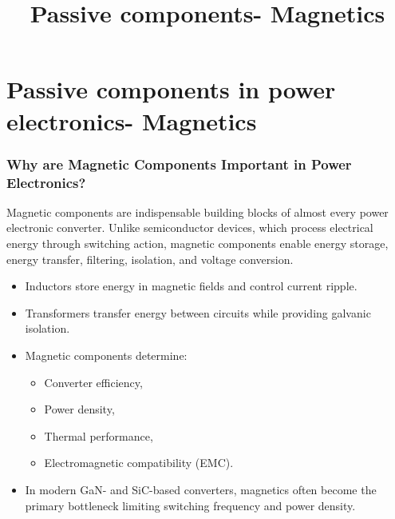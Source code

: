 \section{Passive components in power electronics- Magnetics}
\title[Passive components- Magnetics]{Passive components- Magnetics}  

\begin{frame}[plain]
    \titlepage
\end{frame}



\begin{frame}
\frametitle{Why are Magnetic Components Important in Power Electronics?}
Magnetic components are indispensable building blocks of almost every power electronic converter. Unlike semiconductor devices, which process electrical energy through switching action, magnetic components enable energy storage, energy transfer, filtering, isolation, and voltage conversion.

\begin{itemize}
    \item Inductors store energy in magnetic fields and control current ripple.
    \item Transformers transfer energy between circuits while providing galvanic isolation.
    \item Magnetic components determine:
    \begin{itemize}
        \item Converter efficiency,
        \item Power density,
        \item Thermal performance,
        \item Electromagnetic compatibility (EMC).
    \end{itemize}
    \item In modern GaN- and SiC-based converters, magnetics often become the primary bottleneck limiting switching frequency and power density.
\end{itemize}
\end{frame}

